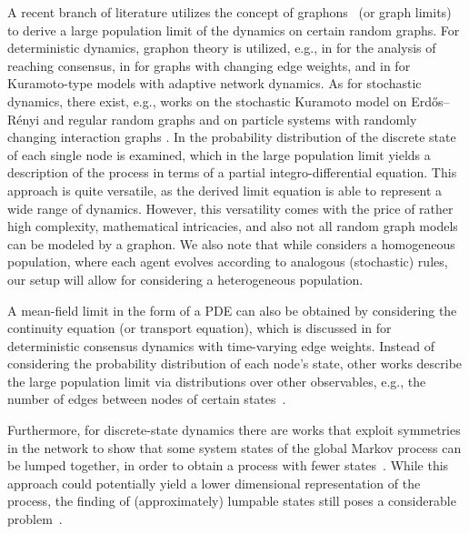 \documentclass[a4paper,
               10pt,
               pdftex,
               normalheadings,
               headsepline,
               footsepline,
               headinclude,
               footinclude,
               DIV=14,
               abstracton]
{scrartcl}
\newcommand{\review}[1]{{#1}}
\begin{document}
A recent branch of literature utilizes the concept of graphons~\cite{lovasz2012large,medvedev2014nonlinear} (or graph limits) to derive a large population limit of the dynamics on certain random graphs. For deterministic dynamics, graphon theory is utilized, e.g., in \cite{lee2018consensus} for the analysis of reaching consensus, in \cite{Ayi2020} for graphs with changing edge weights, and in \cite{gkogkas2022graphop} for Kuramoto-type models with adaptive network dynamics.
As for stochastic dynamics, there exist, e.g., works on the stochastic Kuramoto model on Erd{\H o}s--R\'enyi and regular random graphs \cite{delattre2016note} and on particle systems with randomly changing interaction graphs \cite{BhBuWu19}.
In \cite{keliger2022local} the probability distribution of the discrete state of each single node is examined, which in the large population limit yields a description of the process in terms of a partial \review{integro-}differential equation. 
This approach is quite versatile, as the derived limit equation is able to represent a wide range of dynamics. However, this versatility comes with the price of rather high complexity, mathematical intricacies, and also not all random graph models can be modeled by a graphon.
We also note that while \cite{keliger2022local} considers a homogeneous population, where each agent evolves according to analogous (stochastic) rules, our setup will allow for considering a heterogeneous population.

A mean-field limit in the form of a PDE can also be obtained by considering the continuity equation (or transport equation), which is discussed in \cite{Ayi2020, Duteil2022} for deterministic consensus dynamics with time-varying edge weights.
Instead of considering the probability distribution of each node's state, other works describe the large population limit via distributions over other observables, e.g., the number of edges between nodes of certain states~\cite{Decreusefond2012}.

Furthermore, for discrete-state dynamics there are works that exploit symmetries in the network to show that some system states of the global Markov process can be lumped together, in order to obtain a process with fewer states~\cite{banisch2012agent, Simon2010}. While this approach could potentially yield a lower dimensional representation of the process, the finding of (approximately) lumpable states still poses a considerable problem~\cite{Bittracher2021, bittracher2023optimal}.
\end{document}
